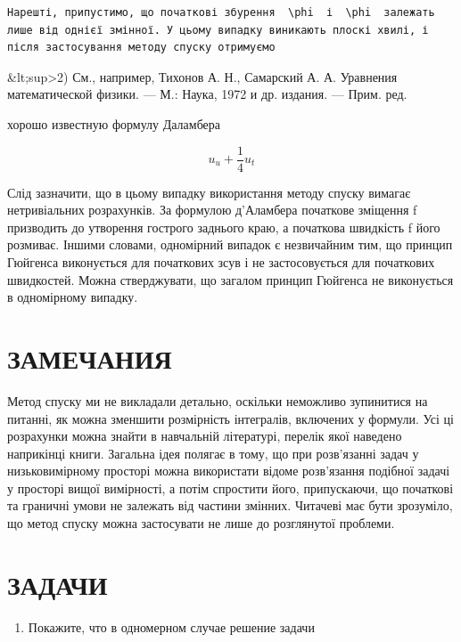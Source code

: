 \documentclass[
  ukrainian,
]{article}
\providecommand{\tightlist}{%
  \setlength{\itemsep}{0pt}\setlength{\parskip}{0pt}}
\begin{document}
\begin{verbatim}
Нарешті, припустимо, що початкові збурення  \phi  і  \phi  залежать лише від однієї змінної. У цьому випадку виникають плоскі хвилі, і після застосування методу спуску отримуємо
\end{verbatim}

\&lt;sup\textgreater2) См., например, Тихонов А. Н., Самарский А. А.
Уравнения математической физики. --- М.: Наука, 1972 и др. издания. ---
Прим. ред.

хорошо известную формулу Даламбера

\[
u_u + \frac{1}{4} u_t
\]

Слід зазначити, що в цьому випадку використання методу спуску вимагає
нетривіальних розрахунків. За формулою д'Аламбера початкове зміщення f
призводить до утворення гострого заднього краю, а початкова швидкість f
його розмиває. Іншими словами, одномірний випадок є незвичайним тим, що
принцип Гюйгенса виконується для початкових зсув і не застосовується для
початкових швидкостей. Можна стверджувати, що загалом принцип Гюйгенса
не виконується в одномірному випадку.

\section{ЗАМЕЧАНИЯ}\label{ux437ux430ux43cux435ux447ux430ux43dux438ux44f-1}

Метод спуску ми не викладали детально, оскільки неможливо зупинитися на
питанні, як можна зменшити розмірність інтегралів, включених у формули.
Усі ці розрахунки можна знайти в навчальній літературі, перелік якої
наведено наприкінці книги. Загальна ідея полягає в тому, що при
розв'язанні задач у низьковимірному просторі можна використати відоме
розв'язання подібної задачі у просторі вищої вимірності, а потім
спростити його, припускаючи, що початкові та граничні умови не залежать
від частини змінних. Читачеві має бути зрозуміло, що метод спуску можна
застосувати не лише до розглянутої проблеми.

\section{ЗАДАЧИ}\label{ux437ux430ux434ux430ux447ux438-3}

\begin{enumerate}
\def\labelenumi{\arabic{enumi}.}
\tightlist
\item
  Покажите, что в одномерном случае решение задачи
\end{enumerate}
\end{document}
